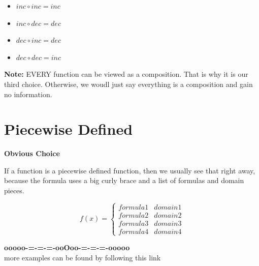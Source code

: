 \documentclass{ximera}
\begin{document}
\begin{itemize}
\item  $inc \circ inc = inc$
\item  $inc \circ dec = dec$
\item  $dec \circ inc = dec$
\item  $dec \circ dec = inc$
\end{itemize}






\textbf{Note:} EVERY function can be viewed as a composition. That is why it is our third choice.  Otherwise, we woudl just say everything is a composition and gain no information.






\section*{Piecewise Defined}


\textbf{\textcolor{purple!85!blue}{Obvious Choice}} 

If a function is a piecewise defined function, then we usually see that right away, because the formula uses a big curly brace and a list of formulas and domain pieces.




\[
f(x) = 
\begin{cases}
  formula 1 & domain 1  \\
  formula 2 & domain 2  \\
  formula 3 & domain 3  \\
  formula 4 & domain 4  
\end{cases}
\]










\begin{center}
\textbf{\textcolor{green!50!black}{ooooo-=-=-=-ooOoo-=-=-=-ooooo}} \\

more examples can be found by following this link\\ 

\end{center}
\end{document}
